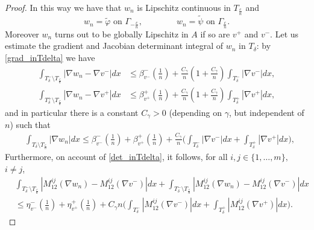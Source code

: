 \documentclass[a4paper,11pt]{article}
\numberwithin{equation}{section}
\newcommand{\R}{\mathbb{R}}
\begin{document}
\begin{proof}
%	
	In this way we have that $w_{n}$ is Lipschitz continuous in $T_{\frac cn}$ and 
	$$w_{n}=\widetilde \varphi \text{ on }\Gamma_{-\frac cn},\qquad \qquad w_{n}=\widetilde \psi \text{ on }\Gamma_{\frac cn}.$$
	Moreover $w_n$ turns out to be globally  Lipschitz in $A$ if so are $v^+$ and $v^-$.
	Let us estimate the gradient and Jacobian determinant integral of $w_{n}$ in $T_{\delta}$: by \eqref{grad_inTdelta}  we have
	\begin{align}\label{gradient1}
	\int_{T^-_\delta\setminus T_{\frac cn}}|\nabla w_{n}-\nabla v^-|dx&\leq   \beta^-_{v^-}(\frac1n)+\frac {C_\gamma}{n}(1+ \frac {C_\gamma}{n})\int_{T_\delta^-} |\nabla v^-|dx,\nonumber\\
	\int_{T^+_\delta\setminus T_{\frac cn}}|\nabla w_{n}-\nabla v^+|dx&\leq   \beta^+_{v^+}(\frac1n)+\frac {C_\gamma}{n}(1+ \frac {C_\gamma}{n})\int_{T_\delta^+} |\nabla v^+|dx,
	\end{align}
and in particular there is a constant $C_\gamma>0$ (depending on $\gamma$, but independent of $n$) such that 
	\begin{align}
	&\int_{T_\delta\setminus T_{\frac cn}}|\nabla w_{n}|dx\leq \beta^-_{v^-}(\frac1n)+  \beta^+_{v^+}(\frac1n)+ \frac { C_\gamma}{n}\Big(\int_{T^-_\delta} |\nabla v^-|dx+\int_{T^+_\delta} |\nabla v^+|dx\Big),\label{257}
\end{align}
Furthermore, 
on account of \eqref{det_inTdelta}, it follows, for all $i,j\in \{1,\dots,m\},$ $i\neq j$,
\begin{align}
&\int_{T_\delta^-\setminus T_{\frac cn}}|M_{12}^{ij}(\nabla w_{n})-M_{12}^{ij}(\nabla v^-)|dx+\int_{T_\delta^-\setminus T_{\frac cn}}|M_{12}^{ij}(\nabla w_{n})-M_{12}^{ij}(\nabla v^-)|dx\nonumber\\
&\leq  \eta^-_{v^-}(\frac1n)+ \eta^+_{v^+}(\frac1n)+{C_\gamma}{n}\Big(\int_{T^-_\delta}|M_{12}^{ij}(\nabla v^-)|dx+\int_{T^+_\delta}|M_{12}^{ij}(\nabla v^+)|dx\Big).\label{258}

\end{align}
\end{proof}
\end{document}
